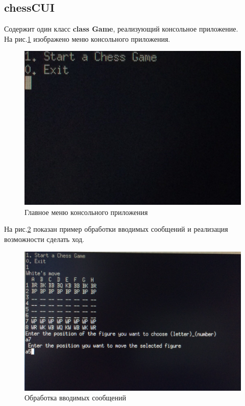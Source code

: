 \subsection*{chessCUI}
Содержит один класс \textbf{class Game}, реализующий консольное приложение.\\
На рис.\ref{pic:CUImenu} изображено меню консольного приложения.\\
\begin{figure}[H]
	\begin{center}
		\includegraphics[scale=0.1]{pics/cuiMenu.jpg}
		\caption{Главное меню консольного приложения} 
		\label{pic:CUImenu} %
	\end{center}
\end{figure}

На рис.\ref{pic:CUIdialog} показан пример обработки вводимых сообщений и реализация возможности сделать ход.\\
\begin{figure}[H]
	\begin{center}
		\includegraphics[scale=0.1]{pics/cui2.jpg}
		\caption{Обработка вводимых сообщений} 
		\label{pic:CUIdialog} %
	\end{center}
\end{figure}

